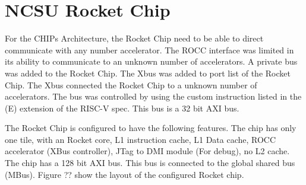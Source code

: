 \documentclass[../main.tex]{subfiles}
\begin{document}
\section{NCSU Rocket Chip}
For the CHIPs Architecture, the Rocket Chip need to be able to direct communicate with any number accelerator. The ROCC interface was limited in its ability to communicate to an unknown number of accelerators. A private bus was added to the Rocket Chip. The Xbus was added to port list of the Rocket Chip. The Xbus connected the Rocket Chip to a unknown number of accelerators. The bus was controlled by using the custom instruction listed in the (E) extension of the RISC-V spec. This bus is a 32 bit AXI bus.

The Rocket Chip is configured to have the following features. The chip has only one tile, with an Rocket core, L1 instruction cache, L1 Data cache, ROCC accelerator (XBus controller), JTag to DMI module (For debug), no L2 cache. The chip has a 128 bit AXI bus. This bus is connected to the global shared bus (MBus). Figure ?? show the layout of the configured Rocket chip.
\end{document}
